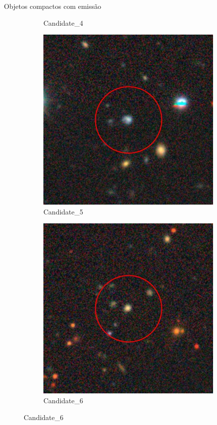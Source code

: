 \begin{frame}[c]{Objetos compactos com emissão}
\begin{figure}[h]
\begin{subfigure}[b]{0.22\textwidth}
        \caption{Candidate\_4}
    \end{subfigure}
    \begin{subfigure}[b]{0.22\textwidth}
        \includegraphics[width=\textwidth]{images/proposatal_candidatas_2/Candidate_5.png}
        \caption{Candidate\_5}
    \end{subfigure}
    \begin{subfigure}[b]{0.22\textwidth}
        \includegraphics[width=\textwidth]{images/proposatal_candidatas_2/Candidate_6.png}
        \caption{Candidate\_6}
    \end{subfigure}
\end{figure}

\end{frame}


